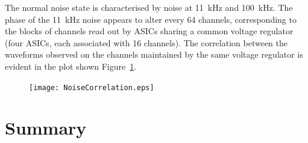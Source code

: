 The normal noise state is characterised by noise at 11~kHz and 100~kHz.  The phase of the 11~kHz noise appears to alter every 64 channels, corresponding to the blocks of channels read out by ASICs sharing a common voltage regulator (four ASICs, each associated with 16 channels).  The correlation between the waveforms observed on the channels maintained by the same voltage regulator is evident in the plot shown Figure~\ref{fig:NoiseCorrelation}.

\begin{figure}
  \centering
  \texttt{[image: NoiseCorrelation.eps]}
  \caption{}
  \label{fig:NoiseCorrelation}
\end{figure}

\section{Summary}\label{sec:35tonSummary}


























